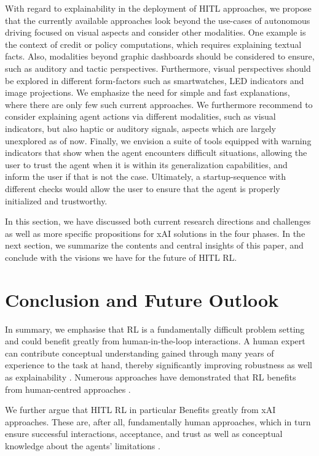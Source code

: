 \documentclass[twoside,11pt]{article}
\begin{document}
\begin{enumerate}
With regard to explainability in the deployment of HITL approaches, we propose that the currently available approaches look beyond the use-cases of autonomous driving focused on visual aspects and consider other modalities. One example is the context of credit or policy computations, which requires explaining textual facts. Also, modalities beyond graphic dashboards should be considered to ensure, such as auditory and tactic perspectives. Furthermore, visual perspectives should be explored in different form-factors such as smartwatches, LED indicators and image projections.
We emphasize the need for simple and fast explanations, where there are only few such current approaches. We furthermore recommend to consider explaining agent actions via different modalities, such as visual indicators, but also haptic or auditory signals, aspects which are largely unexplored as of now. Finally, we envision a suite of tools equipped with warning indicators that show when the agent encounters difficult situations, allowing the user to trust the agent when it is within its generalization capabilities, and inform the user if that is not the case. Ultimately, a startup-sequence with different checks would allow the user to ensure that the agent is properly initialized and trustworthy.

In this section, we have discussed both current research directions and challenges as well as more specific propositions for xAI solutions in the four phases. In the next section, we summarize the contents and central insights of this paper, and conclude with the visions we have for the future of HITL RL.

\section{Conclusion and Future Outlook}
\label{sec:conclusion}
In summary, we emphasise that RL is a fundamentally difficult problem setting and could benefit greatly from human-in-the-loop interactions. A human expert can contribute conceptual understanding gained through many years of experience to the task at hand, thereby significantly improving robustness as well as explainability \citep{Holzinger:2021:TrustAI}. Numerous approaches have demonstrated that RL benefits from human-centred approaches \citep{Li:2019:HumanCenteredRLSurvey,MatthewsonPilarski:2022:DesigningAndEvaluatingHCIML}.

We further argue that HITL RL in particular Benefits greatly from xAI approaches. These are, after all, fundamentally human approaches, which in turn ensure successful interactions, acceptance, and trust as well as conceptual knowledge about the agents' limitations \citep{heuillet2021explainability,milani2022survey}.


\end{enumerate}
\end{document}

